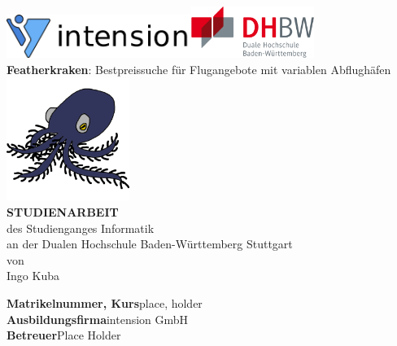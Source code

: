 \documentclass[12pt,twoside,a4paper]{article}
\begin{document}
\begin{center}
\href{https://www.intension.de/}{\includegraphics[width=6cm]{images/intension}}\hfill\href{https://www.dhbw-stuttgart.de}{\includegraphics[width=4cm]{images/dhbw}}\\
\large
\vspace{3cm}
\textbf{Featherkraken}: Bestpreissuche für Flugangebote mit variablen Abflughäfen\\
\vspace{2cm}
\includegraphics[width=4cm]{images/featherkraken}\\
\textbf{\Large STUDIENARBEIT}
\vspace{1cm}
\\des Studienganges Informatik
\\an der Dualen Hochschule Baden-Württemberg Stuttgart
\\von
\\Ingo Kuba
\end{center}
\vfill
\textbf{Matrikelnummer, Kurs}\hfill place, holder\\
\textbf{Ausbildungsfirma}\hfill intension GmbH\\
\textbf{Betreuer}\hfill Place Holder
\newpage
\end{document}
